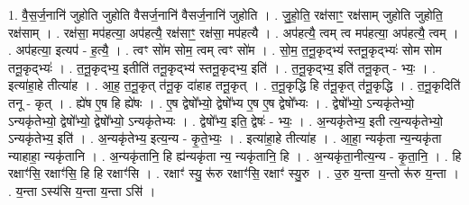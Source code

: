\documentclass[17pt]{extarticle}
\begin{document}
1. वै॒स॒र्ज॒नानि॑ जुहोति जुहोति वैसर्ज॒नानि॑ वैसर्ज॒नानि॑ जुहोति । . जु॒हो॒ति॒ रक्ष॑साꣳ॒॒ रक्ष॑साम् जुहोति जुहोति॒ रक्ष॑साम् । . रक्ष॑सा॒ मप॑हत्या॒ अप॑हत्यै॒ रक्ष॑साꣳ॒॒ रक्ष॑सा॒ मप॑हत्यै । . अप॑हत्यै॒ त्वम् त्व मप॑हत्या॒ अप॑हत्यै॒ त्वम् । . अप॑हत्या॒ इत्यप॑ - ह॒त्यै॒ । . त्वꣳ सो॑म सोम॒ त्वम् त्वꣳ सो॑म । . सो॒म॒ त॒नू॒कृद्भ्य॑ स्तनू॒कृद्भ्यः॑ सोम सोम तनू॒कृद्भ्यः॑ । . त॒नू॒कृद्भ्य॒ इतीति॑ तनू॒कृद्भ्य॑ स्तनू॒कृद्भ्य॒ इति॑ । . त॒नू॒कृद्भ्य॒ इति॑ तनू॒कृत् - भ्यः॒ । . इत्या॑हा॒हे तीत्या॑ह । . आ॒ह॒ त॒नू॒कृत् त॑नू॒कृ दा॑हाह तनू॒कृत् । . त॒नू॒कृद्धि हि त॑नू॒कृत् त॑नू॒कृद्धि । . त॒नू॒कृदिति॑ तनू - कृत् । . ह्ये॑ष ए॒ष हि ह्ये॑षः । . ए॒ष द्वेषो᳚भ्यो॒ द्वेषो᳚भ्य ए॒ष ए॒ष द्वेषो᳚भ्यः । . द्वेषो᳚भ्यो॒ ऽन्यकृ॑तेभ्यो॒ ऽन्यकृ॑तेभ्यो॒ द्वेषो᳚भ्यो॒ द्वेषो᳚भ्यो॒ ऽन्यकृ॑तेभ्यः । . द्वेषो᳚भ्य॒ इति॒ द्वेषः॑ - भ्यः॒ । . अ॒न्यकृ॑तेभ्य॒ इती त्य॒न्यकृ॑तेभ्यो॒ ऽन्यकृ॑तेभ्य॒ इति॑ । . अ॒न्यकृ॑तेभ्य॒ इत्य॒न्य - कृ॒ते॒भ्यः॒ । . इत्या॑हा॒हे तीत्या॑ह । . आ॒हा॒ न्यकृ॑ता न्य॒न्यकृ॑ता न्याहाहा॒ न्यकृ॑तानि । . अ॒न्यकृ॑तानि॒ हि ह्य॑न्यकृ॑ता न्य॒ न्यकृ॑तानि॒ हि । . अ॒न्यकृ॑ता॒नीत्य॒न्य - कृ॒ता॒नि॒ । . हि रक्षाꣳ॑सि॒ रक्षाꣳ॑सि॒ हि हि रक्षाꣳ॑सि । . रक्षाꣳ॑ स्यु॒ रू॑रु रक्षाꣳ॑सि॒ रक्षाꣳ॑ स्यु॒रु । . उ॒रु य॒न्ता य॒न्तो रू॑रु य॒न्ता । . य॒न्ता ऽस्य॑सि य॒न्ता य॒न्ता ऽसि॑ । \newline
\end{document}
